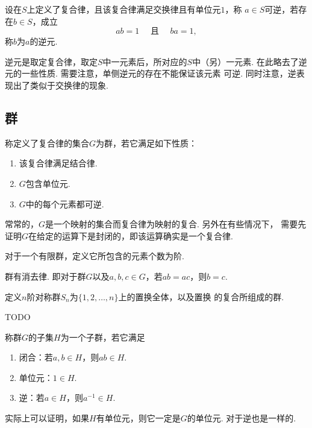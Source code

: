   \begin{defi}[逆]
    设在$S$上定义了复合律，且该复合律满足交换律且有单位元$1$，称
    $a\in S$可逆，若存在$b\in S$，成立
    \[
      ab=1 \quad \text{ 且 } \quad ba = 1,
    \]
    称$b$为$a$的逆元.
  \end{defi}
  \remark
    逆元是取定复合律，取定$S$中一元素后，所对应的$S$中（另）一元素.
    在此略去了逆元的一些性质. 需要注意，单侧逆元的存在不能保证该元素
    可逆. 同时注意，逆表现出了类似于交换律的现象.

\subsection{群}

  \begin{defi}[群]
    称定义了复合律的集合$G$为群，若它满足如下性质：
    \begin{enumerate}
      \item 该复合律满足结合律.
      \item $G$包含单位元.
      \item $G$中的每个元素都可逆.
    \end{enumerate}
  \end{defi}
  \remark
    常常的，$G$是一个映射的集合而复合律为映射的复合. 另外在有些情况下，
    需要先证明$G$在给定的运算下是封闭的，即该运算确实是一个复合律.

  \begin{defi}[阶]
    对于一个有限群，定义它所包含的元素个数为阶.
  \end{defi}

  \begin{pos}[消去律]
    群有消去律. 即对于群$G$以及$a,b,c\in G$，若$ab=ac$，则$b=c$.
  \end{pos}

  \begin{defi}[对称群]
    定义$n$阶对称群$S_n$为$\{1,2,\dots,n\}$上的置换全体，以及置换
    的复合所组成的群.
  \end{defi}

  \begin{pos}[$2$阶对称群]
    TODO
  \end{pos}

  \begin{defi}[子群]
    称群$G$的子集$H$为一个子群，若它满足
    \begin{enumerate}
      \item 闭合：若$a,b\in H$，则$ab\in H$.
      \item 单位元：$1\in H$.
      \item 逆：若$a\in H$，则$a^{-1}\in H$.
    \end{enumerate}
  \end{defi}
  \remark
    实际上可以证明，如果$H$有单位元，则它一定是$G$的单位元. 对于逆也是一样的.

